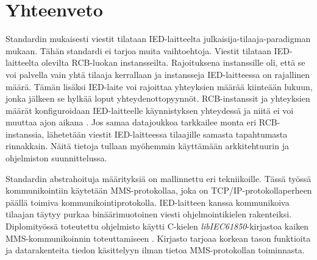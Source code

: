\section{Yhteenveto}
Standardin mukaisesti viestit tilataan IED-laitteelta julkaisija-tilaaja-paradigman mukaan. Tähän standardi ei tarjoa muita vaihtoehtoja. Viestit tilataan IED-laitteelta olevilta RCB-luokan instansseilta. Rajoituksena instanssille oli, että se voi palvella vain yhtä tilaaja kerrallaan ja instansseja IED-laitteessa on rajallinen määrä. Tämän lisäksi IED-laite voi rajoittaa yhteyksien määrää kiinteään lukuun, jonka jälkeen se hylkää loput yhteydenottopyynnöt. RCB-instanssit ja yhteyksien määrät konfiguroidaan IED-laitteelle käynnistyksen yhteydessä ja niitä ei voi muuttaa ajon aikana \cite{IEC61850-6}. Jos samaa datajoukkoa tarkkailee monta eri RCB-instanssia, lähetetään viestit IED-laitteessa tilaajille samasta tapahtumasta rinnakkain. Näitä tietoja tullaan myöhemmin käyttämään arkkitehtuurin ja ohjelmiston suunnittelussa.

Standardin abstrahoituja määrityksiä on mallinnettu eri tekniikoille. Tässä työssä kommunikointiin käytetään MMS-protokollaa, joka on TCP/IP-protokollaperheen päällä toimiva kommunikointiprotokolla. IED-laitteen kanssa kommunikoiva tilaajan täytyy purkaa binäärimuotoinen viesti ohjelmointikielen rakenteiksi. Diplomityössä toteutettu ohjelmisto käytti C-kielen \emph{libIEC61850}-kirjastoa kaiken MMS-kommunikoinnin toteuttamiseen \cite{libIEC61850-homepage}. Kirjasto tarjoaa korkean tason funktioita ja datarakenteita tiedon käsittelyyn ilman tietoa MMS-protokollan toiminnasta.
